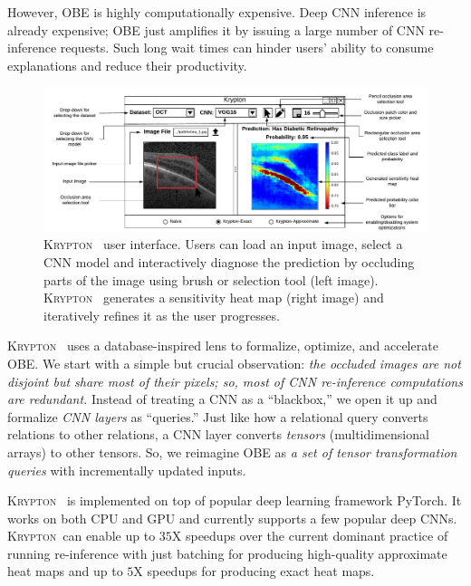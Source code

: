\documentclass{vldb}
\newcommand{\system}{\textsc{Krypton}}
\begin{document}
However, OBE is highly computationally expensive. Deep CNN inference is already expensive; OBE just amplifies it by issuing a large number of CNN re-inference requests. Such long wait times can hinder users' ability to consume explanations and reduce their productivity.

\begin{figure}[t]\label{img:ui}
\includegraphics[width=\textwidth]{images/ui_mockup.pdf}
\caption{\system~ user interface. Users can load an input image, select a CNN model and interactively diagnose the prediction by occluding parts of the image using brush or selection tool (left image). \system~ generates a sensitivity heat map (right image) and iteratively refines it as the user progresses.}
\end{figure}

\system~ uses a database-inspired lens to formalize, optimize, and accelerate OBE. We start with a simple but crucial observation: \textit{the occluded images are not disjoint but share most of their pixels; so, most of CNN re-inference computations are redundant.} Instead of treating a CNN as a ``blackbox,'' we open it up and formalize \textit{CNN layers} as ``queries.'' Just like how a relational query converts relations to other relations, a CNN layer converts \textit{tensors} (multidimensional arrays) to other tensors. So, we reimagine OBE as \textit{a set of tensor transformation queries} with incrementally updated inputs.

\system~ is implemented on top of popular deep learning framework PyTorch. It works on both CPU and GPU and currently supports a few popular deep CNNs. \system ~can enable up to $35$X speedups over the current dominant practice of running re-inference with just batching for producing high-quality approximate heat maps and up to $5$X speedups for producing exact heat maps.
\end{document}
